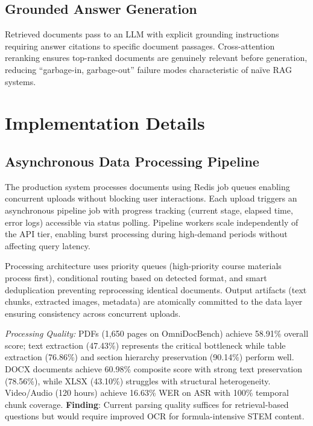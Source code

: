 \documentclass[11pt,a4paper,twocolumn]{article}
\begin{document}
\subsection{Grounded Answer Generation}

Retrieved documents pass to an LLM with explicit grounding instructions requiring answer citations to specific document passages. Cross-attention reranking ensures top-ranked documents are genuinely relevant before generation, reducing ``garbage-in, garbage-out'' failure modes characteristic of naïve RAG systems.

\section{Implementation Details}

\subsection{Asynchronous Data Processing Pipeline}

The production system processes documents using Redis job queues enabling concurrent uploads without blocking user interactions. Each upload triggers an asynchronous pipeline job with progress tracking (current stage, elapsed time, error logs) accessible via status polling. Pipeline workers scale independently of the API tier, enabling burst processing during high-demand periods without affecting query latency.

Processing architecture uses priority queues (high-priority course materials process first), conditional routing based on detected format, and smart deduplication preventing reprocessing identical documents. Output artifacts (text chunks, extracted images, metadata) are atomically committed to the data layer ensuring consistency across concurrent uploads.

\textit{Processing Quality:} PDFs (1,650 pages on OmniDocBench) achieve 58.91\% overall score; text extraction (47.43\%) represents the critical bottleneck while table extraction (76.86\%) and section hierarchy preservation (90.14\%) perform well. DOCX documents achieve 60.98\% composite score with strong text preservation (78.56\%), while XLSX (43.10\%) struggles with structural heterogeneity. Video/Audio (120 hours) achieve 16.63\% WER on ASR with 100\% temporal chunk coverage. \textbf{Finding}: Current parsing quality suffices for retrieval-based questions but would require improved OCR for formula-intensive STEM content.
\end{document}
